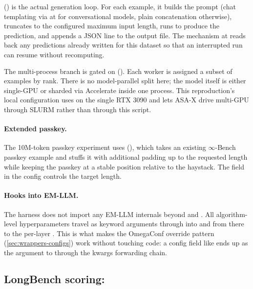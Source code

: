  () is the actual generation loop. For each example, it builds the prompt (chat templating via  at  for conversational models, plain concatenation otherwise), truncates to the configured maximum input length, runs  to produce the prediction, and appends a JSON line to the output file. The  mechanism at  reads back any predictions already written for this dataset so that an interrupted run can resume without recomputing.

The multi-process branch is gated on  (). Each worker is assigned a subset of examples by rank. There is no model-parallel split here; the model itself is either single-GPU or sharded via Accelerate inside one process. This reproduction's local configuration uses  on the single RTX 3090 and lets ASA-X drive multi-GPU through SLURM rather than through this script.

\paragraph{Extended passkey.} The 10M-token passkey experiment uses  (), which takes an existing $\infty$-Bench passkey example and stuffs it with additional padding up to the requested length while keeping the passkey at a stable position relative to the haystack. The  field in the config controls the target length.

\paragraph{Hooks into EM-LLM.} The harness does not import any EM-LLM internals beyond  and . All algorithm-level hyperparameters travel as keyword arguments through  into  and from there to the per-layer . This is what makes the OmegaConf override pattern (\cref{sec:wrappers-configs}) work without touching code: a config field like  ends up as the  argument to  through the kwargs forwarding chain.

\subsection{LongBench scoring: }
\label{sec:bench-eval}

